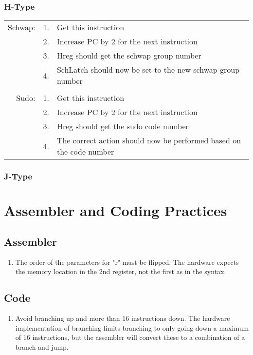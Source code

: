 \documentclass{article}
\begin{document}
		\subsubsection{H-Type}
			\begin{tabular}{ r  r  p{12cm} }
					Schwap: & 1. & Get this instruction\\
					        & 2. & Increase PC by 2 for the next instruction\\
					        & 3. & Hreg should get the schwap group number\\
					        & 4. & SchLatch should now be set to the new schwap group number\\
					        &    & \\
					Sudo:   & 1. & Get this instruction\\
					        & 2. & Increase PC by 2 for the next instruction\\
					        & 3. & Hreg should get the sudo code number\\
					        & 4. & The correct action should now be performed based on the code number\\
			\end{tabular}
		\subsubsection{J-Type}
\section{Assembler and Coding Practices}
	\subsection{Assembler}
		\begin{enumerate}
			\item The order of the parameters for "r" must be flipped.  The hardware expects the memory location in the 2nd register, not the first as in the syntax.
		\end{enumerate}
	\subsection{Code}
		\begin{enumerate}
			\item Avoid branching up and more than 16 instructions down.  The hardware implementation of branching limits branching to only going down a maximum of 16 instructions, but the assembler will convert these to a combination of a branch and jump.
		\end{enumerate}
\end{document}
